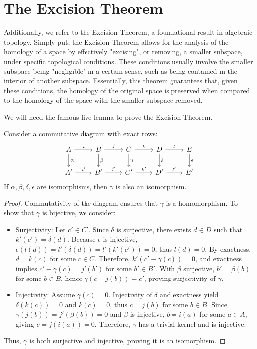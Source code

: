 \section{The Excision Theorem}
Additionally, we refer to the Excision Theorem, a foundational result in
algebraic topology. Simply put, the Excision Theorem allows for the analysis of
the homology of a space by effectively "excising", or removing, a smaller
subspace, under specific topological conditions. These conditions usually
involve the smaller subspace being "negligible" in a certain sense, such as being
contained in the interior of another subspace. Essentially, this theorem guarantees
that, given these conditions, the homology of the original space is preserved when
compared to the homology of the space with the smaller subspace removed.

We will need the famous five lemma to prove the Excision Theorem.

\begin{lemma}
	\label{fivelemma} Consider a commutative diagram with exact rows:
	\begin{equation}
		\begin{tikzcd}
			A \arrow[r, "i"] \arrow[d, "\alpha"] & B \arrow[r, "j"] \arrow[d, "\beta"]
			& C \arrow[r, "k"] \arrow[d, "\gamma"] & D \arrow[r, "l"] \arrow[d, "\delta"]
			& E \arrow[d, "\epsilon"] \\ A' \arrow[r, "i'"] & B' \arrow[r, "j'"] & C'
			\arrow[r, "k'"] & D' \arrow[r, "l'"] & E'
		\end{tikzcd}
	\end{equation}
	If $\alpha, \beta, \delta, \epsilon$ are isomorphisms, then $\gamma$ is also an
	isomorphism.
\end{lemma}

\begin{proof}
	Commutativity of the diagram ensures that $\gamma$ is a homomorphism. To show
	that $\gamma$ is bijective, we consider:

	\begin{itemize}
		\item Surjectivity: Let $c' \in C'$. Since $\delta$ is surjective, there
			exists $d \in D$ such that $k'(c') = \delta(d)$. Because $\epsilon$ is injective,
			$\epsilon(l(d)) = l'(\delta(d)) = l'(k'(c')) = 0$, thus $l(d) = 0$. By
			exactness, $d = k(c)$ for some $c \in C$. Therefore, $k'(c' - \gamma(c)) =
			0$, and exactness implies $c' - \gamma(c) = j'(b')$ for some $b' \in B'$. With
			$\beta$ surjective, $b' = \beta(b)$ for some $b \in B$, hence $\gamma(c + j
			(b)) = c'$, proving surjectivity of $\gamma$.

		\item Injectivity: Assume $\gamma(c) = 0$. Injectivity of $\delta$ and exactness
			yield $\delta(k(c)) = 0$ and $k(c) = 0$, thus $c = j(b)$ for some
			$b \in B$. Since $\gamma(j(b)) = j'(\beta(b)) = 0$ and $\beta$ is injective,
			$b = i(a)$ for some $a \in A$, giving $c = j(i(a)) = 0$. Therefore, $\gamma$
			has a trivial kernel and is injective.
	\end{itemize}

	Thus, $\gamma$ is both surjective and injective, proving it is an isomorphism.
\end{proof}

